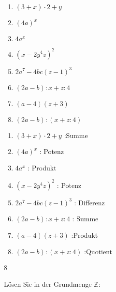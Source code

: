 {{\begin{multicols}{3}
\begin{enumerate}[label=\alph*)]
 \item $(3+x)\cdot{}2 + y$ 
 \item $(4a)^x$
 \item$4a^x$
 \item$(x-2y^4z)^2$
 \item$2a^7 - 4bc(z-1)^3$
 \item$(2a -b) : x + z : 4$
 \item$(a-4)(z+3)$ 
 \item$(2a-b):(x+z:4)$ 
\end{enumerate}
\end{multicols}
}{
\begin{multicols}{3}
\begin{enumerate}[label=\alph*)]
 \item $(3+x)\cdot{}2 + y$ :Summe
 \item $(4a)^x$ : Potenz
 \item$4a^x$ : Produkt
 \item$(x-2y^4z)^2$ : Potenz
 \item$2a^7 - 4bc(z-1)^3$ : Differenz
 \item$(2a -b) : x + z : 4$  : Summe
 \item$(a-4)(z+3)$   :Produkt
 \item$(2a-b):(x+z:4)$ :Quotient
\end{enumerate}
\end{multicols}
}{8}%



Lösen Sie in der Grundmenge $\mathbb{Z}$:

\kTrainingAufgabe{
  
}}
